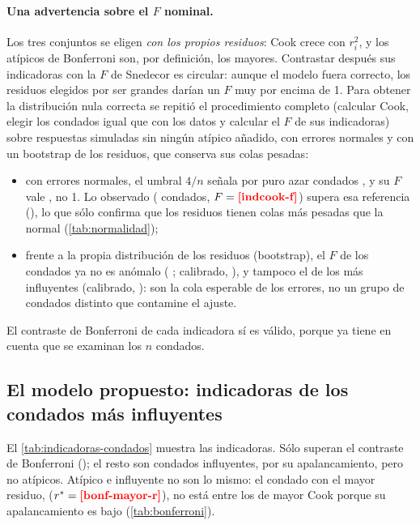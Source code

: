 \paragraph{Una advertencia sobre el $F$ nominal.} Los tres conjuntos se eligen \emph{con los
propios residuos}: Cook crece con $r_i^2$, y los atípicos de Bonferroni son, por definición, los
mayores. Contrastar después sus indicadoras con la $F$ de Snedecor es circular: aunque el modelo
fuera correcto, los residuos elegidos por ser grandes darían un $F$ muy por encima de 1. Para
obtener la distribución nula correcta se repitió el procedimiento completo (calcular Cook, elegir
los condados igual que con los datos y calcular el $F$ de sus indicadoras) sobre 
respuestas simuladas sin ningún atípico añadido, con errores normales y con un bootstrap de los
residuos, que conserva sus colas pesadas:
\begin{itemize}
  \item con errores normales, el umbral $4/n$ señala por puro azar  condados
  , y su $F$ vale  , no 1. Lo observado
  ( condados, $F=\res{indcook-f}$) supera esa referencia (),
  lo que sólo confirma que los residuos tienen colas más pesadas que la normal (\cref{tab:normalidad});
  \item frente a la propia distribución de los residuos (bootstrap), el $F$ de los 
  condados ya no es anómalo ( ; calibrado,
  ), y tampoco el de los  más influyentes (calibrado,
  ): son la cola esperable de los errores, no un grupo de condados distinto que
  contamine el ajuste.
\end{itemize}
El contraste de Bonferroni de cada indicadora sí es válido, porque ya tiene en cuenta que se
examinan los $n$ condados.

\subsection{El modelo propuesto: indicadoras de los condados más influyentes}



El \cref{tab:indicadoras-condados} muestra las  indicadoras. Sólo
 superan el contraste de Bonferroni (); el resto son condados
influyentes, por su apalancamiento, pero no atípicos. Atípico e influyente no son lo mismo: el
condado con el mayor residuo,  ($r^{*}=\res{bonf-mayor-r}$), no está entre los
 de mayor Cook porque su apalancamiento es bajo (\cref{tab:bonferroni}).


